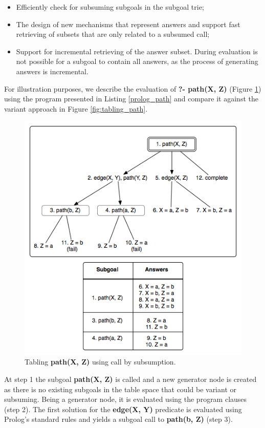 \begin{itemize}
  \item Efficiently check for subsuming subgoals in the subgoal trie;
  \item The design of new mechanisms that represent answers and support fast retrieving of subsets that are only related to a subsumed call;
  \item Support for incremental retrieving of the answer subset. During evaluation is not possible for a subgoal to
  contain all answers, as the process of generating answers is incremental.
\end{itemize}

For illustration purposes, we describe the evaluation of \textbf{?- path(X, Z)} (Figure \ref{fig:tabling_path_sub}) using the program presented in Listing \ref{prolog_path}
and compare it against the variant approach in Figure \ref{fig:tabling_path}.

\begin{figure}[ht]
  \centering
    \includegraphics[scale=0.6]{tabling_path_sub.png}
  \caption{Tabling \textbf{path(X, Z)} using call by subsumption.}
  \label{fig:tabling_path_sub}
\end{figure}

At step 1 the subgoal \textbf{path(X, Z)} is called and a new generator node is created as there is no existing subgoals in the table space
that could be variant or subsuming. Being a generator node, it is evaluated using the program clauses (step 2). The first solution
for the \textbf{edge(X, Y)} predicate is evaluated using Prolog's standard rules and yields a subgoal call to \textbf{path(b, Z)} (step 3).

